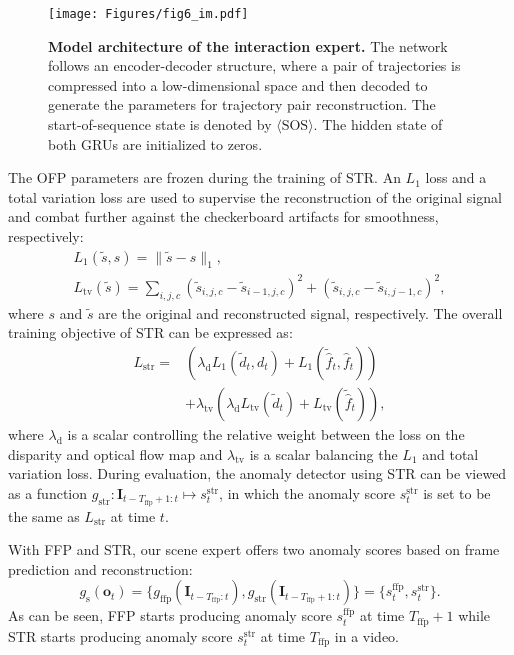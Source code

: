 \begin{figure*}[t]
  \centering
  \texttt{[image: Figures/fig6\_im.pdf]}
  \caption{\textbf{Model architecture of the interaction expert.} The network follows an encoder-decoder structure, where a pair of trajectories is compressed into a low-dimensional space and then decoded to generate the parameters for trajectory pair reconstruction. The start-of-sequence state is denoted by $\langle \text{SOS} \rangle$. The hidden state of both GRUs are initialized to zeros.}
  \label{fig:im}
\end{figure*}

The OFP parameters are frozen during the training of STR. An $L_1$ loss and a total variation loss are used to supervise the reconstruction of the original signal and combat further against the checkerboard artifacts for smoothness, respectively:
\begin{gather}
L_1 (\tilde{s}, s) = \| \tilde{s} - s \|_1, \\
L_\text{tv} (\tilde{s}) = \sum_{i,j,c} \left(\tilde{s}_{i,j,c} - \tilde{s}_{i-1,j,c}\right)^2 + \left(\tilde{s}_{i,j,c} - \tilde{s}_{i,j-1,c}\right)^2,
\end{gather}
where $s$ and $\tilde{s}$ are the original and reconstructed signal, respectively. The overall training objective of STR can be expressed as:
\begin{equation}
\label{eq:str-objective}
\begin{aligned}
L_\text{str}
=
&\left(
\lambda_\text{d} L_1 (\tilde{d}_t, d_t)
+
L_1 (\tilde{\hat{f}}_t, \hat{f}_t)
\right) \\
&+
\lambda_\text{tv}
\left(
\lambda_\text{d} L_\text{tv}(\tilde{d}_t)
+
L_\text{tv} (\tilde{\hat{f}}_t)
\right),
\end{aligned}
\end{equation}
where $\lambda_\text{d}$ is a scalar controlling the relative weight between the loss on the disparity and optical flow map and $\lambda_\text{tv}$ is a scalar balancing the $L_1$ and total variation loss. During evaluation, the anomaly detector using STR can be viewed as a function $g_\text{str}:\mathbf{I}_{t-T_\text{ffp}+1:t} \mapsto s_t^\text{str}$, in which the anomaly score $s_t^\text{str}$ is set to be the same as $L_\text{str}$ at time $t$.

With FFP and STR, our scene expert offers two anomaly scores based on frame prediction and reconstruction:
\begin{equation}
g_\text{s} (\mathbf{o}_t)
=
\{ g_\text{ffp} (\mathbf{I}_{t - T_\text{ffp}:t}), g_\text{str} (\mathbf{I}_{t - T_\text{ffp}+1:t}) \}
=
\{s_t^\text{ffp}, s_t^\text{str}\}.
\end{equation}
As can be seen, FFP starts producing anomaly score $s_t^\text{ffp}$ at time $T_\text{ffp} + 1$ while STR starts producing anomaly score $s_t^\text{str}$ at time $T_\text{ffp}$ in a video.

